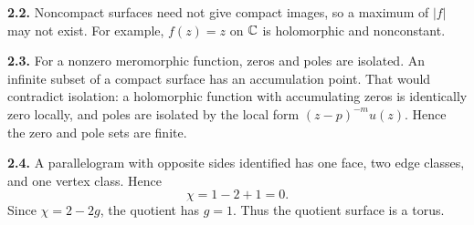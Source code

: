 \textbf{2.2.} Noncompact surfaces need not give compact images, so a maximum of
\(|f|\) may not exist.  For example, \(f(z)=z\) on \(\mathbb{C}\) is holomorphic and
nonconstant.

\begin{center}
\end{center}

\textbf{2.3.} For a nonzero meromorphic function, zeros and poles are isolated.
An infinite subset of a compact surface has an accumulation point.  That would
contradict isolation: a holomorphic function with accumulating zeros is
identically zero locally, and poles are isolated by the local form
\((z-p)^{-m}u(z)\).  Hence the zero and pole sets are finite.

\begin{center}
\end{center}

\textbf{2.4.} A parallelogram with opposite sides identified has one face, two
edge classes, and one vertex class.  Hence
\[
  \chi=1-2+1=0.
\]
Since \(\chi=2-2g\), the quotient has \(g=1\).  Thus the quotient surface is a
torus.

